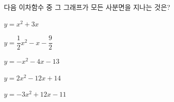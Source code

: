 \hspace*{2mm}\begin{minipage}[t]{\dimexpr\linewidth-2mm\relax}\vspace{0pt}
다음 이차함수 중 그 그래프가 모든 사분면을 지나는 것은?
\begin{choicesii}{\rule[-3ex]{0pt}{8ex}$y=x^2+3x$}{\rule[-3ex]{0pt}{8ex}$y=\dfrac{1}{2}x^2-x-\dfrac{9}{2}$}{\rule[-3ex]{0pt}{8ex}$y=-x^2-4x-13$}{\rule[-3ex]{0pt}{8ex}$y=2x^2-12x+14$}{\rule[-3ex]{0pt}{8ex}$y=-3x^2+12x-11$}\end{choicesii}\end{minipage}
